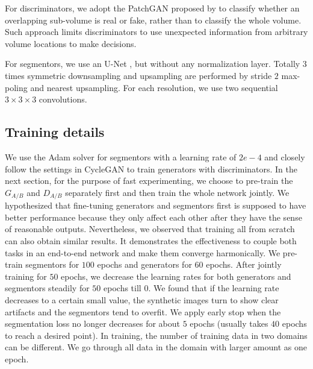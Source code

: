 \documentclass[10pt,twocolumn,letterpaper]{article}
\begin{document}
For discriminators, we adopt the PatchGAN proposed by \cite{shrivastava2016learning} to classify whether an overlapping sub-volume is real or fake, rather than to classify the whole volume. Such approach limits discriminators to use unexpected information from arbitrary volume locations to make decisions. 

For segmentors, we use an U-Net \cite{ronneberger2015u}, but without any normalization layer. Totally 3 times symmetric downsampling and upsampling are performed by stride $2$ max-poling and nearest upsampling. For each resolution, we use two sequential $3{\times}3{\times}3$ convolutions.


\subsection{Training details}
We use the Adam solver \cite{kingma2014adam} for segmentors with a learning rate of $2e{-}4$ and closely follow the settings in CycleGAN to train generators with discriminators. 
In the next section, for the purpose of fast experimenting, we choose to pre-train the $G_{A/B}$ and $D_{A/B}$ separately first and then train the whole network jointly. We hypothesized that fine-tuning generators and segmentors first is supposed to have better performance because they only affect each other after they have the sense of reasonable outputs.
Nevertheless, we observed that training all from scratch can also obtain similar results. 
It demonstrates the effectiveness to couple both tasks in an end-to-end network and make them converge harmonically.
We pre-train segmentors for $100$ epochs and generators for $60$ epochs. After jointly training for $50$ epochs, we decrease the learning rates for both generators and segmentors steadily for $50$ epochs till 0. We found that if the learning rate decreases to a certain small value, the synthetic images turn to show clear artifacts and the segmentors tend to overfit. We apply early stop when the segmentation loss no longer decreases for about $5$ epochs (usually takes $40$ epochs to reach a desired point). In training, the number of training data in two domains can be different. We go through all data in the domain with larger amount as one epoch. 
\end{document}
